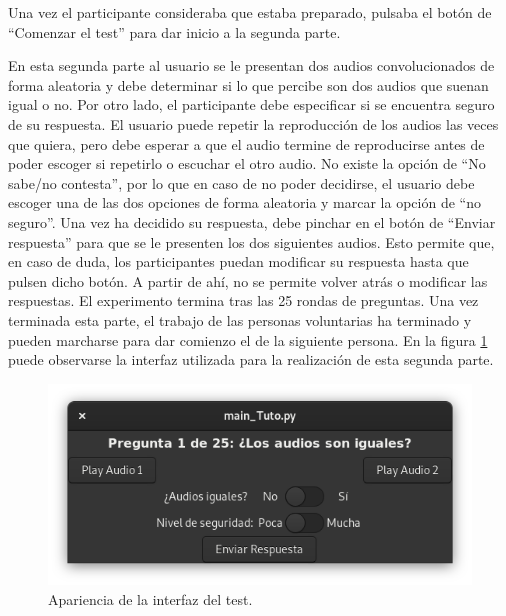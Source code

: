 \documentclass[11pt,a4paper,twoside]{book}
\begin{document}
                    Una vez el participante consideraba que estaba preparado, pulsaba el botón de ``Comenzar el test'' para dar inicio a la segunda parte.
                
                    En esta segunda parte al usuario se le presentan dos audios convolucionados de forma aleatoria y debe determinar si lo que percibe son dos audios que suenan igual o no. Por otro lado, el participante debe especificar si se encuentra seguro de su respuesta. El usuario puede repetir la reproducción de los audios las veces que quiera, pero debe esperar a que el audio termine de reproducirse antes de poder escoger si repetirlo o escuchar el otro audio. No existe la opción de ``No sabe/no contesta'', por lo que en caso de no poder decidirse, el usuario debe escoger una de las dos opciones de forma aleatoria y marcar la opción de ``no seguro''. Una vez ha decidido su respuesta, debe pinchar en el botón de ``Enviar respuesta'' para que se le presenten los dos siguientes audios. Esto permite que, en caso de duda, los participantes puedan modificar su respuesta hasta que pulsen dicho botón. A partir de ahí, no se permite volver atrás o modificar las respuestas. El experimento termina tras las 25 rondas de preguntas. Una vez terminada esta parte, el trabajo de las personas voluntarias ha terminado y pueden marcharse para dar comienzo el de la siguiente persona. En la figura \ref{fig:interfazTestFin} puede observarse la interfaz utilizada para la realización de esta segunda parte.
                
                    \begin{figure}
                        \includegraphics[scale=0.6]{../imagenes/interFin.png}
			            \centering
			            \caption{Apariencia de la interfaz del test.}
			            \label{fig:interfazTestFin}
                    \end{figure}
                
\end{document}
